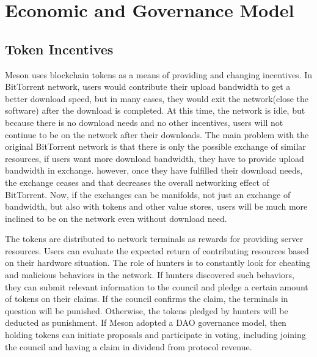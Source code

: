 \documentclass[12pt, a4paper, unicode]{report}
\begin{document}
    \section{Economic and Governance Model}
    \subsection{Token Incentives}
    
    Meson uses blockchain tokens as a means of providing and changing incentives. In BitTorrent network, users would contribute their upload bandwidth to get a better download speed, but in many cases, they would exit the network(close the software) after the download is completed. At this time, the network is idle, but because there is no download needs and no other incentives, users will not continue to be on the network after their downloads. The main problem with the original BitTorrent network is that there is only the possible exchange of similar resources, if users want more download bandwidth, they have to provide upload bandwidth in exchange. however, once they have fulfilled their download needs, the exchange ceases and that decreases the overall networking effect of BitTorrent. Now, if the exchanges can be manifolds, not just an exchange of bandwidth, but also with tokens and other value stores, users will be much more inclined to be on the network even without download need.

    
    The tokens are distributed to network terminals as rewards for providing server resources. Users can evaluate the expected return of contributing resources based on their hardware situation. The role of hunters is to constantly look for cheating and malicious behaviors in the network. If hunters discovered such behaviors, they can submit relevant information to the council and pledge a certain amount of tokens on their claims. If the council confirms the claim, the terminals in question will be punished. Otherwise, the tokens pledged by hunters will be deducted as punishment. If Meson adopted a DAO governance model, then holding tokens can initiate proposals and participate in voting, including joining the council and having a claim in dividend from protocol revenue.
    
\end{document}
